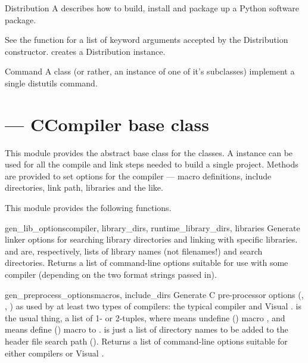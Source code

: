 \documentclass{manual}
\begin{document}
\begin{classdesc*}{Distribution}
A  describes how to build, install and package up a
Python software package. 

See the  function for a list of keyword arguments accepted 
by the Distribution constructor.  creates a Distribution
instance.
\end{classdesc*}

\begin{classdesc*}{Command}
A  class (or rather, an instance of one of it's subclasses)
implement a single distutils command.
\end{classdesc*}


\section{ --- CCompiler base class}

This module provides the abstract base class for the  
classes.  A  instance can be used for all the compile 
and link steps needed to build a single project. Methods are provided to 
set options for the compiler --- macro definitions, include directories, 
link path, libraries and the like.

This module provides the following functions.

\begin{funcdesc}{gen_lib_options}{compiler, library_dirs, runtime_library_dirs, libraries}
Generate linker options for searching library directories and
linking with specific libraries.   and  are,
respectively, lists of library names (not filenames!) and search
directories.  Returns a list of command-line options suitable for use
with some compiler (depending on the two format strings passed in).
\end{funcdesc}
    
\begin{funcdesc}{gen_preprocess_options}{macros, include_dirs}
Generate C pre-processor options (, ,
) as used by at least
two types of compilers: the typical \UNIX{} compiler and Visual \Cpp.
 is the usual thing, a list of 1- or 2-tuples, where
 means undefine () macro ,
and  means define ()
macro  to .   is just a list of
directory names to be added to the header file search path ().
Returns a list of command-line options suitable for either \UNIX{} compilers
or Visual \Cpp.
\end{funcdesc}
\end{document}
